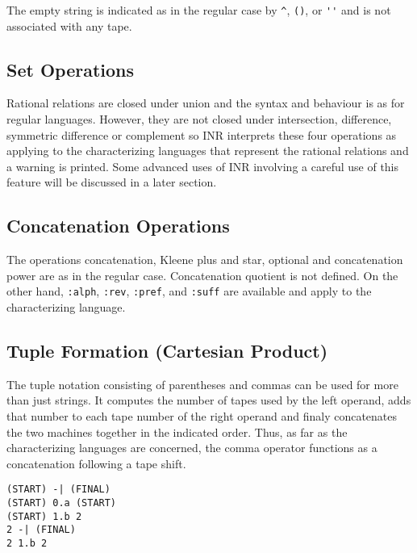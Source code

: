 The empty string is indicated as in the regular case by \verb#^#,
\verb#()#, or \verb#''# and is not associated with any tape.

\subsection{Set Operations}
Rational relations are closed under union and the syntax and behaviour is
as for regular languages.
However, they are not closed under intersection, difference,
symmetric difference or complement so INR interprets these four operations
as applying to the characterizing languages that represent the rational
relations and a warning is printed.
Some advanced uses of INR involving a careful use of this feature will be
discussed in a later section.

\subsection{Concatenation Operations}
The operations concatenation, Kleene plus and star, optional and concatenation
power are as in the regular case.
Concatenation quotient is not defined.
On the other hand, \verb#:alph#, \verb#:rev#, \verb#:pref#, and
\verb#:suff# are available and apply to the characterizing language.

\subsection{Tuple Formation (Cartesian Product)}
The tuple notation consisting of parentheses and commas can be used for
more than just strings.
It computes the number of tapes used by the left operand, adds that number
to each tape number of the right operand and finaly concatenates the two
machines together in the indicated order.
Thus, as far as the characterizing languages are concerned, the comma
operator functions as a concatenation following a tape shift.
\begin{center}\begin{minipage}[t]{3in}\begin{minipage}[t]{3in}\end{minipage}\end{minipage}
\begin{minipage}[t]{1.6in}\begin{verbatim}
(START) -| (FINAL)
(START) 0.a (START)
(START) 1.b 2
2 -| (FINAL)
2 1.b 2
\end{verbatim}\end{minipage}\end{center}

